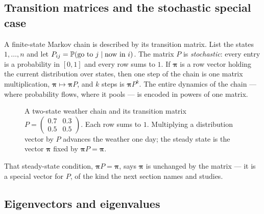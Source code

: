\subsection{Transition matrices and the stochastic special case}
\label{chAcla:transition}

A finite-state Markov chain is described by its transition matrix. List the states $1,\dots,n$ and
let $P_{ij}=\operatorname{\mathbb{P}}(\text{go to }j \mid \text{now in }i)$. The matrix $P$ is \emph{stochastic}: every entry is a probability in
$[0,1]$ and every row sums to $1$. If $\boldsymbol\pi$ is a row vector holding the current
distribution over states, then one step of the chain is one matrix multiplication, $\boldsymbol\pi
\mapsto \boldsymbol\pi P$, and $k$ steps is $\boldsymbol\pi P^k$. The entire dynamics of the chain ---
where probability flows, where it pools --- is encoded in powers of one matrix.

\begin{figure}[H]
\centering
{}
\caption{A two-state weather chain and its transition matrix $P=\left(\begin{smallmatrix} 0.7 & 0.3
\\ 0.5 & 0.5 \end{smallmatrix}\right)$. Each row sums to $1$. Multiplying a distribution vector by $P$
advances the weather one day; the steady state is the vector $\boldsymbol\pi$ fixed by $\boldsymbol\pi
P=\boldsymbol\pi$.}
\label{chAcla:fig-markov}
\end{figure}

That steady-state condition, $\boldsymbol\pi P = \boldsymbol\pi$, says $\boldsymbol\pi$ is unchanged by
the matrix --- it is a special vector for $P$, of the kind the next section names and studies.

\subsection{Eigenvectors and eigenvalues}
\label{chAcla:eigen}

